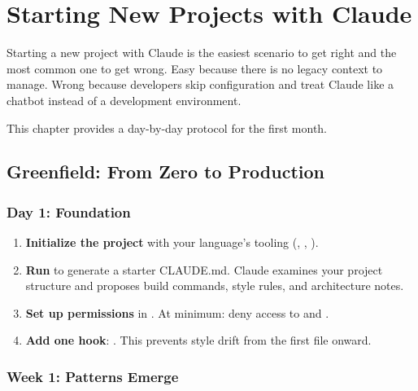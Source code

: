 \chapter{Starting New Projects with Claude}
\label{ch:greenfield}

Starting a new project with Claude is the easiest scenario to get right
and the most common one to get wrong. Easy because there is no legacy
context to manage. Wrong because developers skip configuration and treat
Claude like a chatbot instead of a development environment.

This chapter provides a day-by-day protocol for the first month.

\section{Greenfield: From Zero to Production}
\label{sec:greenfield-protocol}


\subsection{Day 1: Foundation}

\begin{enumerate}
  \item \textbf{Initialize the project} with your language's tooling
    (, , ).
  \item \textbf{Run } to generate a starter CLAUDE.md.
    Claude examines your project structure and proposes build commands,
    style rules, and architecture notes.
  \item \textbf{Set up permissions} in .
    At minimum: deny access to  and .
  \item \textbf{Add one hook}: .
    This prevents style drift from the first file onward.
\end{enumerate}


\subsection{Week 1: Patterns Emerge}

